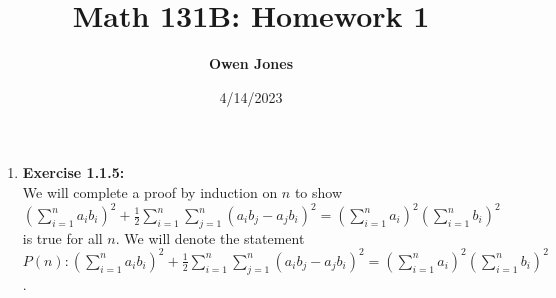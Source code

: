 \documentclass[10pt]{article}
\title{\bf Math 131B: Homework 1}
\date{4/14/2023}
\author{\bf Owen Jones}
\begin{document}
\maketitle

\begin{enumerate}[label=\bfseries Problem \arabic*:]
    \item \textbf{Exercise 1.1.5:}\\
    We will complete a proof by induction on $n$ to show $(\displaystyle{\sum_{i=1}^{n}}a_ib_i)^2
    +\frac{1}{2}\displaystyle{\sum_{i=1}^{n}}\displaystyle{\sum_{j=1}^{n}} (a_ib_j-a_jb_i)^2
    =(\displaystyle{\sum_{i=1}^{n}}a_i)^2(\displaystyle{\sum_{i=1}^{n}}b_i)^2$ is true for all $n$.
    We will denote the statement $P(n):(\displaystyle{\sum_{i=1}^{n}}a_ib_i)^2
    +\frac{1}{2}\displaystyle{\sum_{i=1}^{n}}\displaystyle{\sum_{j=1}^{n}} (a_ib_j-a_jb_i)^2
    =(\displaystyle{\sum_{i=1}^{n}}a_i)^2(\displaystyle{\sum_{i=1}^{n}}b_i)^2$.\\
   

\end{enumerate}
\end{document}
